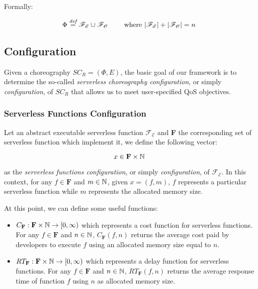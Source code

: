 Formally: 

\begin{equation}
\Phi \overset{\textit{def}}{=} \mathscr{F_E} \cup \mathscr{F_O} \qquad \text{ where } |\mathscr{F_E}| + |\mathscr{F_O}| = n
\end{equation}

\subsection{Configuration}

Given a choreography $SC_R = (\Phi,E)$, the basic goal of our framework is to determine the so-called \textit{serverless choreography configuration}, or simply \textit{configuration}, of $SC_R$ that allows us to meet user-specified QoS objectives.

\subsubsection{Serverless Functions Configuration}

Let an abstract executable serverless function $\mathscr{F_E}$ and \textbf{F} the corresponding set of serverless function which implement it, we define the following vector:

\begin{equation}
	x \in \textbf{F} \times \mathbb{N}
\end{equation}

as the \textit{serverless functions configuration}, or simply \textit{configuration}, of $\mathscr{F_E}$. In this context, for any $f \in \textbf{F}$ and $m \in \mathbb{N}$, given $x =(f,m)$, $f$ represents a particular serverless function while $m$ represents the allocated memory size.

At this point, we can define some useful functions:

\begin{itemize}	
	\item $C_{\textbf{F}} : \textbf{F} \times \mathbb{N} \to \left[ 0, \infty \right)$ which represents a cost function for serverless functions. For any $f \in \textbf{F}$ and $n \in \mathbb{N}$, $C_{\textbf{F}}(f,n)$ returns the average cost paid by developers to execute $f$ using an allocated memory size equal to $n$.
	
	\item $RT_{\textbf{F}} : \textbf{F} \times \mathbb{N} \to \left[ 0, \infty \right)$ which represents a delay function for serverless functions. For any $f \in \textbf{F}$ and $n \in \mathbb{N}$, $RT_{\textbf{F}}(f,n)$ returns the average response time of function $f$ using $n$ as allocated memory size.
\end{itemize}

